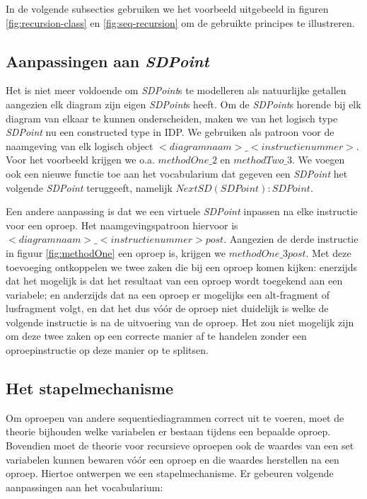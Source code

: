 In de volgende subsecties gebruiken we het voorbeeld uitgebeeld in figuren \ref{fig:recursion-class} en \ref{fig:seq-recursion} om de gebruikte principes te illustreren.

\subsection{Aanpassingen aan \textit{SDPoint}}
Het is niet meer voldoende om \textit{SDPoint}s te modelleren als natuurlijke getallen aangezien elk diagram zijn eigen \textit{SDPoint}s heeft. Om de \textit{SDPoint}s horende bij elk diagram van elkaar te kunnen onderscheiden, maken we van het logisch type \textit{SDPoint} nu een constructed type in IDP. We gebruiken als patroon voor de naamgeving van elk logisch object $<diagramnaam>\_<instructienummer>$. Voor het voorbeeld krijgen we o.a. $methodOne\_2$ en $methodTwo\_3$. We voegen ook een nieuwe functie toe aan het vocabularium dat gegeven een \textit{SDPoint} het volgende \textit{SDPoint} teruggeeft, namelijk $NextSD(SDPoint) : SDPoint$.

Een andere aanpassing is dat we een virtuele \textit{SDPoint} inpassen na elke instructie voor een oproep. Het naamgevingspatroon hiervoor is $<diagramnaam>\_<instructienummer>post$. Aangezien de derde instructie in figuur \ref{fig:methodOne} een oproep is, krijgen we $methodOne\_3post$. Met deze toevoeging ontkoppelen we twee zaken die bij een oproep komen kijken: enerzijds dat het mogelijk is dat het resultaat van een oproep wordt toegekend aan een variabele; en anderzijds dat na een oproep er mogelijks een alt-fragment of lusfragment volgt, en dat het dus v\'o\'or de oproep niet duidelijk is welke de volgende instructie is na de uitvoering van de oproep. Het zou niet mogelijk zijn om deze twee zaken op een correcte manier af te handelen zonder een oproepinstructie op deze manier op te splitsen.

\subsection{Het stapelmechanisme}
Om oproepen van andere sequentiediagrammen correct uit te voeren, moet de theorie bijhouden welke variabelen er bestaan tijdens een bepaalde oproep. Bovendien moet de theorie voor recursieve oproepen ook de waardes van een set variabelen kunnen bewaren v\'o\'or een oproep en die waardes herstellen na een oproep. Hiertoe ontwerpen we een stapelmechanisme. Er gebeuren volgende aanpassingen aan het vocabularium:

